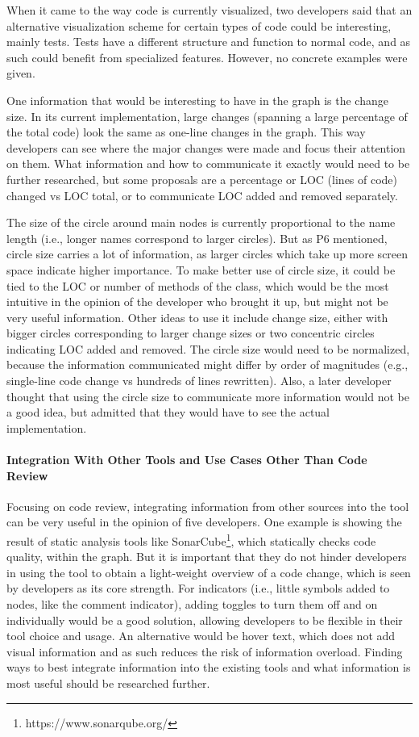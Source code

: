 \documentclass[a4paper,11pt,twoside]{article}
\theoremstyle{definition} %
\begin{document}
When it came to the way code is currently visualized, two developers said that an alternative visualization scheme for certain types of code could be interesting, mainly tests. Tests have a different structure and function to normal code, and as such could benefit from specialized features. However, no concrete examples were given. 

One information that would be interesting to have in the graph is the change size. In its current implementation, large changes (spanning a large percentage of the total code) look the same as one-line changes in the graph. This way developers can see where the major changes were made and focus their attention on them. What information and how to communicate it exactly would need to be further researched, but some proposals are a percentage or LOC (lines of code) changed vs LOC total, or to communicate LOC added and removed separately. 

The size of the circle around main nodes is currently proportional to the name length (i.e., longer names correspond to larger circles). But as P6 mentioned, circle size carries a lot of information, as larger circles which take up more screen space indicate higher importance. To make better use of circle size, it could be tied to the LOC or number of methods of the class, which would be the most intuitive in the opinion of the developer who brought it up, but might not be very useful information. Other ideas to use it include change size, either with bigger circles corresponding to larger change sizes or two concentric circles indicating LOC added and removed. The circle size would need to be normalized, because the information communicated might differ by order of magnitudes (e.g., single-line code change vs hundreds of lines rewritten). Also, a later developer thought that using the circle size to communicate more information would not be a good idea, but admitted that they would have to see the actual implementation.


\paragraph{Integration With Other Tools and Use Cases Other Than Code Review} \label{Par:IntegrationOtherTools}

Focusing on code review, integrating information from other sources into the tool can be very useful in the opinion of five developers. One example is showing the result of static analysis tools like SonarCube\footnote{https://www.sonarqube.org/}, which statically checks code quality, within the graph. But it is important that they do not hinder developers in using the tool to obtain a light-weight overview of a code change, which is seen by developers as its core strength. For indicators (i.e., little symbols added to nodes, like the comment indicator), adding toggles to turn them off and on individually would be a good solution, allowing developers to be flexible in their tool choice and usage. An alternative would be hover text, which does not add visual information and as such reduces the risk of information overload. Finding ways to best integrate information into the existing tools and what information is most useful should be researched further.
\end{document}
